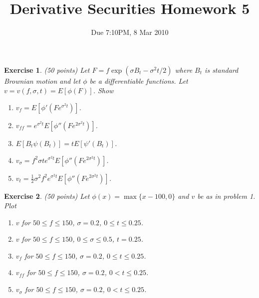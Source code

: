 \documentclass[11pt,fleqn]{amsproc}
\newtheorem{xca}{Exercise}
\begin{document}
\title{Derivative Securities Homework 5}
\author{Due 7:10PM, 8 Mar 2010}

\maketitle

\begin{xca}{(50 points)}
Let $F = f\exp(\sigma B_t - \sigma^2t/2)$ where $B_t$ is
standard Brownian motion and let
$\phi$ be a differentiable functions. Let $v =
v(f,\sigma,t) = E[\phi(F)]$. Show
\begin{enumerate}
\item $v_f = E[\phi'(Fe^{\sigma^2t})]$.
\item $v_{ff} = e^{\sigma^2t}E[\phi''(Fe^{2\sigma^2t})]$.
\item $E[B_t\psi(B_t)] = tE[\psi'(B_t)]$.
\item $v_\sigma = f^2\sigma te^{\sigma^2t}E[\phi''(Fe^{2\sigma^2t})]$.
\item $v_t = \frac{1}{2}\sigma^2 f^2e^{\sigma^2t}E[\phi''(Fe^{2\sigma^2t})]$.
\end{enumerate}
\end{xca}

\begin{xca}{(50 points)}
Let $\phi(x) = \max\{x - 100, 0\}$ and $v$ be as in problem 1. Plot
\begin{enumerate}
\item $v$ for $50\le f\le 150$, $\sigma = 0.2$, $0\le t\le 0.25$.
\item $v$ for $50\le f\le 150$, $0\le\sigma\le 0.5$, $t = 0.25$.
\item $v_f$ for $50\le f\le 150$, $\sigma = 0.2$, $0\le t\le 0.25$.
\item $v_{ff}$ for $50\le f\le 150$, $\sigma = 0.2$, $0 < t\le 0.25$.
\item $v_\sigma$ for $50\le f\le 150$, $\sigma = 0.2$, $0 < t\le 0.25$.
\end{enumerate}
\end{xca}
\end{document}
